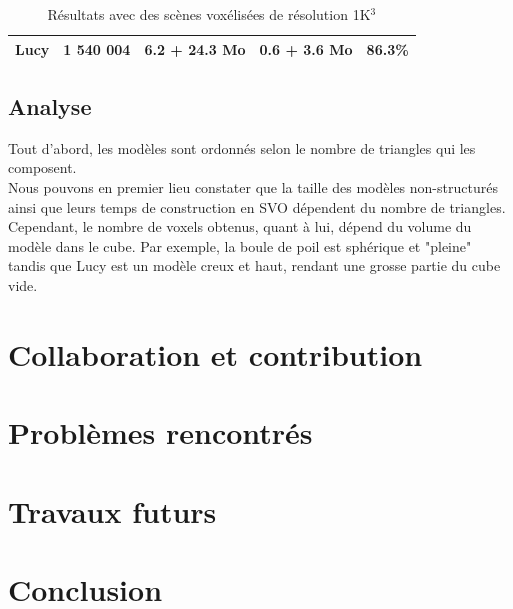 \documentclass[12pt,a4paper,twoside]{article}
\begin{document}
\begin{table}[H]
\begin{tabular}{lllll}
            \multicolumn{1}{|l|}{Lucy}     & \multicolumn{1}{l|}{1 540 004}                                                  & \multicolumn{1}{l|}{6.2 + 24.3 Mo}                                                              & \multicolumn{1}{l|}{0.6 + 3.6 Mo}                                                                 & \multicolumn{1}{l|}{86.3\%}                                                            \\ \hline
        \end{tabular}
        \caption{Résultats avec des scènes voxélisées de résolution 1K$^{3}$}
    \end{table}

    \newpage
    \subsection{Analyse}

    Tout d'abord, les modèles sont ordonnés selon le nombre de triangles qui les composent. \\
    Nous pouvons en premier lieu constater que la taille des modèles non-structurés ainsi que leurs temps de construction
    en SVO dépendent du nombre de triangles. \\
    Cependant, le nombre de voxels obtenus, quant à lui, dépend du volume du modèle dans le cube.
    Par exemple, la boule de poil est sphérique et "pleine" tandis que Lucy est un modèle creux et haut, rendant une grosse partie du cube vide.

    \newpage
    \section{Collaboration et contribution}

    \newpage
    \section{Problèmes rencontrés}

    \newpage
    \section{Travaux futurs}

    \newpage
    \section{Conclusion}                            %
\end{document}

